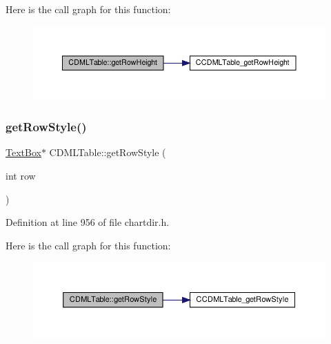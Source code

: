 Here is the call graph for this function\+:
\nopagebreak
\begin{figure}[H]
\begin{center}
\leavevmode
\includegraphics[width=350pt]{class_c_d_m_l_table_a3cf2436c72b48dd1f97fb9ffd26c96be_cgraph}
\end{center}
\end{figure}
\mbox{\label{class_c_d_m_l_table_a02ec17c1c346f6da4e61d17147aa90a2}} 
\subsubsection{\texorpdfstring{get\+Row\+Style()}{getRowStyle()}}
{\footnotesize\ttfamily \hyperlink{class_text_box}{Text\+Box}$\ast$ C\+D\+M\+L\+Table\+::get\+Row\+Style (\begin{DoxyParamCaption}\item[{int}]{row }\end{DoxyParamCaption})\hspace{0.3cm}{\ttfamily [inline]}}



Definition at line 956 of file chartdir.\+h.

Here is the call graph for this function\+:
\nopagebreak
\begin{figure}[H]
\begin{center}
\leavevmode
\includegraphics[width=350pt]{class_c_d_m_l_table_a02ec17c1c346f6da4e61d17147aa90a2_cgraph}
\end{center}
\end{figure}
\mbox{\label{class_c_d_m_l_table_af43e533e15a7d7af5699bb7b695f30ba}} 
